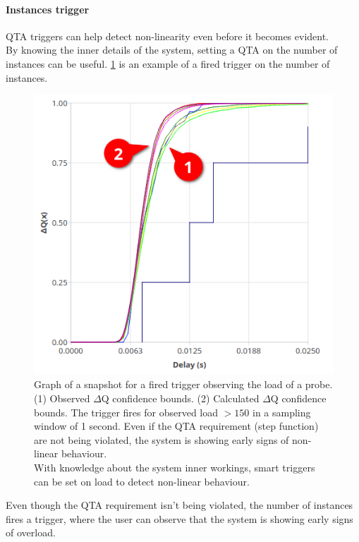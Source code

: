         \paragraph{Instances trigger}

        QTA triggers can help detect non-linearity even before it becomes evident. \\
        By knowing the inner details of the system, setting a QTA on the number of instances can be useful. \cref{fig:qta_trig} is an example of a fired trigger on the number of instances.

        \begin{figure}[H]
            \begin{center}
                \includegraphics[scale=0.5]{img/overload_2/fired_samplea.png}
            \end{center}
            \caption{Graph of a snapshot for a fired trigger observing the load of a probe. (1) Observed $\Delta$Q confidence bounds. (2) Calculated $\Delta$Q confidence bounds. The trigger fires for observed load $> 150$ in a sampling window of 1 second. Even if the QTA requirement (step function) are not being violated, the system is showing early signs of non-linear behaviour.\\
            With knowledge about the system inner workings, smart triggers can be set on load to detect non-linear behaviour.}%
            \label{fig:qta_trig}%
        \end{figure}
        Even though the QTA requirement isn't being violated, the number of instances fires a trigger, where the user can observe that the system is showing early signs of overload.
  
